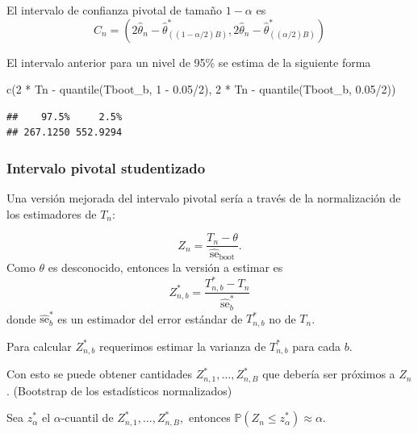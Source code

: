 \documentclass[
  12pt,
]{book}
\newenvironment{Shaded}{\begin{snugshade}}{\end{snugshade}}
\newcommand{\DecValTok}[1]{\textcolor[rgb]{0.00,0.00,0.81}{#1}}
\newcommand{\FloatTok}[1]{\textcolor[rgb]{0.00,0.00,0.81}{#1}}
\newcommand{\FunctionTok}[1]{\textcolor[rgb]{0.00,0.00,0.00}{#1}}
\newcommand{\NormalTok}[1]{#1}
\newcommand{\SpecialCharTok}[1]{\textcolor[rgb]{0.00,0.00,0.00}{#1}}
\begin{document}
El intervalo de confianza pivotal de tamaño \(1-\alpha\) es \[
  C_{n}=\left(2 \widehat{\theta}_{n}-\widehat{\theta}_{((1-\alpha / 2) B)}^{*}, 2 \widehat{\theta}_{n}-\widehat{\theta}_{((\alpha / 2) B)}^{*}\right)
  \]

El intervalo anterior para un nivel de 95\% se estima de la siguiente
forma

\begin{Shaded}
\begin{Highlighting}[]
\FunctionTok{c}\NormalTok{(}\DecValTok{2} \SpecialCharTok{*}\NormalTok{ Tn }\SpecialCharTok{{-}} \FunctionTok{quantile}\NormalTok{(Tboot\_b, }\DecValTok{1} \SpecialCharTok{{-}} \FloatTok{0.05}\SpecialCharTok{/}\DecValTok{2}\NormalTok{), }\DecValTok{2} \SpecialCharTok{*}\NormalTok{ Tn }\SpecialCharTok{{-}}
    \FunctionTok{quantile}\NormalTok{(Tboot\_b, }\FloatTok{0.05}\SpecialCharTok{/}\DecValTok{2}\NormalTok{))}
\end{Highlighting}
\end{Shaded}

\begin{verbatim}
##    97.5%     2.5% 
## 267.1250 552.9294
\end{verbatim}

\hypertarget{intervalo-pivotal-studentizado}{%
\subsubsection{Intervalo pivotal
studentizado}\label{intervalo-pivotal-studentizado}}

Una versión mejorada del intervalo pivotal sería a través de la
normalización de los estimadores de \(T_n\):

\[
Z_{n}=\frac{T_{n}-\theta}{\widehat{\mathrm{se}}_{\mathrm{boot}}}.
\] Como \(\theta\) es desconocido, entonces la versión a estimar es \[
Z_{n, b}^{*}=\frac{T_{n, b}^{*}-T_{n}}{\widehat{\mathrm{se}}_{b}^{*}}
\] donde \(\widehat{\mathrm{se}}_{b}^{*}\) es un estimador del error
estándar de \(T_{n, b}^{*}\) no de \(T_{n}\).

Para calcular \(Z_{n, b}^{*}\) requerimos estimar la varianza de
\(T_{n,b}^*\) para cada \(b\).

Con esto se puede obtener cantidades
\(Z_{n, 1}^{*}, \ldots, Z_{n, B}^{*}\) que debería ser próximos a
\(Z_{n}\). (Bootstrap de los estadísticos normalizados)

Sea \(z_{\alpha}^{*}\) el \(\alpha\)-cuantil de
\(Z_{n, 1}^{*}, \ldots, Z_{n, B}^{*},\) entonces
\(\mathbb{P}\left(Z_{n} \leq z_{\alpha}^{*}\right) \approx \alpha\).
\end{document}
